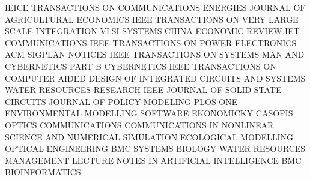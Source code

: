 	IEICE TRANSACTIONS ON COMMUNICATIONS			ENERGIES			JOURNAL OF AGRICULTURAL ECONOMICS
	IEEE TRANSACTIONS ON VERY LARGE SCALE INTEGRATION VLSI SYSTEMS			CHINA ECONOMIC REVIEW			IET COMMUNICATIONS
	IEEE TRANSACTIONS ON POWER ELECTRONICS			ACM SIGPLAN NOTICES			IEEE TRANSACTIONS ON SYSTEMS MAN AND CYBERNETICS PART B CYBERNETICS
	IEEE TRANSACTIONS ON COMPUTER AIDED DESIGN OF INTEGRATED CIRCUITS AND SYSTEMS			WATER RESOURCES RESEARCH			IEEE JOURNAL OF SOLID STATE CIRCUITS
	JOURNAL OF POLICY MODELING			PLOS ONE			ENVIRONMENTAL MODELLING SOFTWARE
	EKONOMICKY CASOPIS			OPTICS COMMUNICATIONS			COMMUNICATIONS IN NONLINEAR SCIENCE AND NUMERICAL SIMULATION
	ECOLOGICAL MODELLING			OPTICAL ENGINEERING			BMC SYSTEMS BIOLOGY
	WATER RESOURCES MANAGEMENT			LECTURE NOTES IN ARTIFICIAL INTELLIGENCE			BMC BIOINFORMATICS